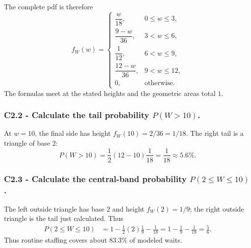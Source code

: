 The complete pdf is therefore
\[
 f_W(w)=\begin{cases}
 \dfrac{w}{18},&0\le w\le3,\\[1mm]
 \dfrac{9-w}{36},&3<w\le6,\\[1mm]
 \dfrac1{12},&6<w\le9,\\[1mm]
 \dfrac{12-w}{36},&9<w\le12,\\[1mm]
 0,&\text{otherwise.}
 \end{cases}
\]
The formulas meet at the stated heights and the geometric areas total $1$.

\subsubsection*{C2.2 - Calculate the tail probability $P(W>10)$.}
\label{subsec:c2-piecewise-linear-gate-b}
At $w=10$, the final side has height $f_W(10)=2/36=1/18$.  The right tail is
a triangle of base $2$:
\[
 P(W>10)=\frac12(12-10)\frac1{18}=\frac1{18}\approx5.6\%.
\]

\subsubsection*{C2.3 - Calculate the central-band probability
$P(2\le W\le10)$.}
\label{subsec:c2-piecewise-linear-gate-c}
The left outside triangle has base $2$ and height $f_W(2)=1/9$; the right
outside triangle is the tail just calculated.  Thus
\[
 \begin{aligned}
 P(2\le W\le10)
 &=1-\frac12(2)\frac19-\frac1{18}
 =1-\frac19-\frac1{18}=\frac56.
 \end{aligned}
\]
Thus routine staffing covers about $83.3\%$ of modeled waits.


